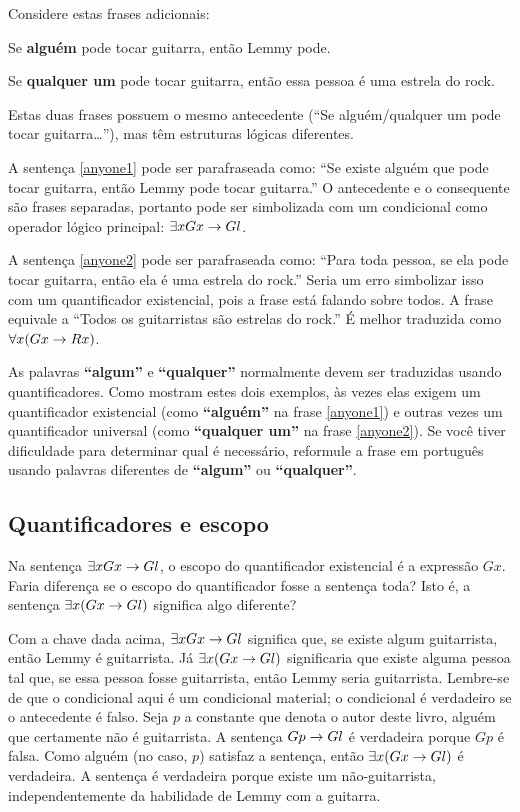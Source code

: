 Considere estas frases adicionais:

\begin{earg}
\item[\ex{anyone1}] Se \textbf{alguém} pode tocar guitarra, então Lemmy pode.
\item[\ex{anyone2}] Se \textbf{qualquer um} pode tocar guitarra, então essa pessoa é uma estrela do rock.
\end{earg}

Estas duas frases possuem o mesmo antecedente (``Se alguém/qualquer um pode tocar guitarra\ldots''), mas têm estruturas lógicas diferentes.

A sentença \ref{anyone1} pode ser parafraseada como: ``Se existe alguém que pode tocar guitarra, então Lemmy pode tocar guitarra.'' O antecedente e o consequente são frases separadas, portanto pode ser simbolizada com um condicional como operador lógico principal: $\exists x Gx \rightarrow Gl$.

A sentença \ref{anyone2} pode ser parafraseada como: ``Para toda pessoa, se ela pode tocar guitarra, então ela é uma estrela do rock.'' Seria um erro simbolizar isso com um quantificador existencial, pois a frase está falando sobre todos. A frase equivale a ``Todos os guitarristas são estrelas do rock.'' É melhor traduzida como $\forall x(Gx \rightarrow Rx)$.

As palavras \textbf{``algum''} e \textbf{``qualquer''} normalmente devem ser traduzidas usando quantificadores. Como mostram estes dois exemplos, às vezes elas exigem um quantificador existencial (como \textbf{``alguém''} na frase \ref{anyone1}) e outras vezes um quantificador universal (como \textbf{``qualquer um''} na frase \ref{anyone2}). Se você tiver dificuldade para determinar qual é necessário, reformule a frase em português usando palavras diferentes de \textbf{``algum''} ou \textbf{``qualquer''}.

\subsection{Quantificadores e escopo}

Na sentença $\exists x Gx \rightarrow Gl$, o escopo do quantificador existencial é a expressão $Gx$. Faria diferença se o escopo do quantificador fosse a sentença toda? Isto é, a sentença $\exists x (Gx \rightarrow Gl)$ significa algo diferente?

Com a chave dada acima, $\exists x Gx \rightarrow Gl$ significa que, se existe algum guitarrista, então Lemmy é guitarrista. Já $\exists x (Gx \rightarrow Gl)$ significaria que existe alguma pessoa tal que, se essa pessoa fosse guitarrista, então Lemmy seria guitarrista. Lembre-se de que o condicional aqui é um condicional material; o condicional é verdadeiro se o antecedente é falso. Seja $p$ a constante que denota o autor deste livro, alguém que certamente não é guitarrista. A sentença $Gp \rightarrow Gl$ é verdadeira porque $Gp$ é falsa. Como alguém (no caso, $p$) satisfaz a sentença, então $\exists x (Gx \rightarrow Gl)$ é verdadeira. A sentença é verdadeira porque existe um não-guitarrista, independentemente da habilidade de Lemmy com a guitarra.


